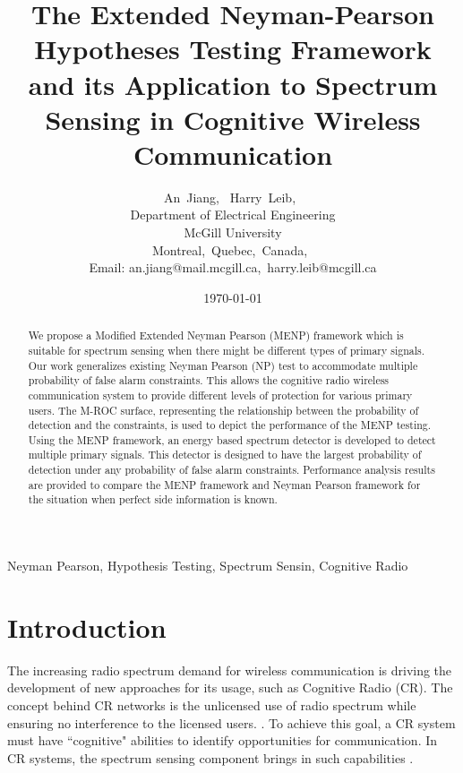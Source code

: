\documentclass[12pt,journal,a4paper,twoside,onecolumn]{IEEEtran}
\author{An~Jiang,~
        Harry~Leib,~\\
          Department of Electrical Engineering\\
          McGill University\\
          Montreal,~Quebec,~Canada,~\\
          Email: an.jiang@mail.mcgill.ca,~harry.leib@mcgill.ca
}
\title{The Extended Neyman-Pearson Hypotheses Testing Framework and its Application to Spectrum Sensing in Cognitive Wireless Communication}
\date{\today}
\begin{document}
\begin{spacing}{2}
\maketitle
\begin{abstract}
We propose a Modified Extended Neyman Pearson (MENP) framework which is suitable for spectrum sensing when there might be different types of primary signals. Our work generalizes existing Neyman Pearson (NP) test to accommodate multiple probability of false alarm constraints. This allows the cognitive radio wireless communication system to provide different levels of protection for various primary users.  
The M-ROC surface, representing the relationship between the probability of detection and the constraints, is used to depict the performance of the MENP testing.   
Using the MENP framework, an energy based spectrum detector is developed to detect multiple primary signals. This detector is designed to have the largest probability of detection under any probability of false alarm constraints. 
Performance analysis results are provided to compare the MENP framework and Neyman Pearson framework for the situation when perfect side information is known.
\end{abstract}

\begin{IEEEkeywords}
Neyman Pearson, Hypothesis Testing, Spectrum Sensin, Cognitive Radio
\end{IEEEkeywords}

\section{Introduction}
The increasing radio spectrum demand for wireless communication is driving the development of new approaches for its usage, such as Cognitive Radio (CR)\cite{a001}. The concept behind CR networks is the unlicensed use of radio spectrum while ensuring no interference to the licensed users. \cite{goldsmith2009breaking}.
To achieve this goal, a CR system must have ``cognitive" abilities to identify opportunities for communication\cite{buddhikot2007understanding}. In CR systems, the spectrum sensing component brings in such capabilities \cite{tandra2009spectrum}.


\end{spacing}
\end{document}
